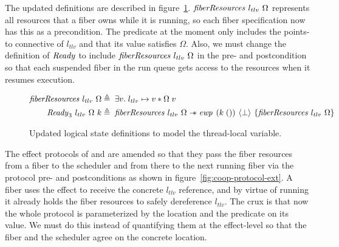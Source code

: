 The updated definitions are described in figure~\ref{fig:logical-state-ext}.
\(\mathit{fiberResources}~{l_{tlv}}~{\Omega}\) represents all resources that a fiber owns while it is running, so each fiber specification now has this as a precondition.
The predicate at the moment only includes the points-to connective of \(l_{tlv}\) and that its value satisfies \(\Omega\).
Also, we must change the definition of \(\mathit{Ready}{}\) to include \(\mathit{fiberResources}~{l_{tlv}}~{\Omega}\) in the pre- and postcondition so that each suspended fiber in the run queue gets access to the resources when it resumes execution.

\begin{figure}[ht]
  \begin{align*}
    \gsFiberResources{l_{tlv}}{\Omega} & \triangleq\; \exists v.\; l_{tlv} \mapsto v \ast \Omega\; v                                                    \\
    \gsReady{3}~l_{tlv}~\Omega~k       & \triangleq\; \gsFiberResources{l_{tlv}}{\Omega} \wand{} \ewp{k\; ()}{\bot}{\gsFiberResources{l_{tlv}}{\Omega}}
  \end{align*}
  \caption{Updated logical state definitions to model the thread-local variable.}
  \label{fig:logical-state-ext}
\end{figure}

The effect protocols of \efork{} and \esuspend{} are amended so that they pass the fiber resources from a fiber to the scheduler and from there to the next running fiber via the protocol pre- and postconditions as shown in figure~\ref{fig:coop-protocol-ext}.
A fiber uses the \egetctx{} effect to receive the concrete \(l_{tlv}\) reference, and by virtue of running it already holds the fiber resources to safely dereference \(l_{tlv}\).
The crux is that now the whole protocol  is parameterized by the location and the predicate on its value.
We must do this instead of quantifying them at the effect-level so that the fiber and the scheduler agree on the concrete location.

